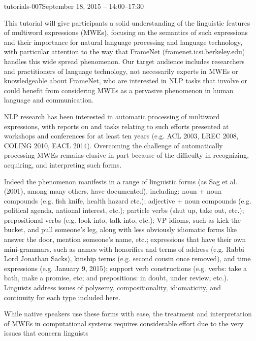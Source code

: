 \begin{tutorial}{tutorials-007}{September 18, 2015 -- 14:00--17:30}
{\TutLocG}

This tutorial will give participants a solid understanding of the
linguistic features of multiword expressions (MWEs), focusing on the
semantics of such expressions and their importance for natural language
processing and language technology, with particular attention to the
way that FrameNet (framenet.icsi.berkeley.edu) handles this wide spread
phenomenon. Our target audience includes researchers and practitioners
of language technology, not necessarily experts in MWEs or knowledgeable
about FrameNet, who are interested in NLP tasks that involve or could
benefit from considering MWEs as a pervasive phenomenon in human language
and communication.

NLP research has been interested in automatic processing of multiword
expressions, with reports on and tasks relating to such efforts presented
at workshops and conferences for at least ten years (e.g. ACL 2003,
LREC 2008, COLING 2010, EACL 2014). Overcoming the challenge of automatically
processing MWEs remains elusive in part because of the difficulty
in recognizing, acquiring, and interpreting such forms.

Indeed the phenomenon manifests in a range of linguistic forms (as
Sag et al. (2001), among many others, have documented), including:
noun + noun compounds (e.g. fish knife, health hazard etc.); adjective
+ noun compounds (e.g. political agenda, national interest, etc.);
particle verbs (shut up, take out, etc.); prepositional verbs (e.g.
look into, talk into, etc.); VP idioms, such as kick the bucket, and
pull someone’s leg, along with less obviously idiomatic forms like
answer the door, mention someone’s name, etc.; expressions that have
their own mini-grammars, such as names with honorifics and terms of
address (e.g. Rabbi Lord Jonathan Sacks), kinship terms (e.g. second
cousin once removed), and time expressions (e.g. January 9, 2015);
support verb constructions (e.g. verbs: take a bath, make a promise,
etc; and prepositions: in doubt, under review, etc.). Linguists address
issues of polysemy, compositionality, idiomaticity, and continuity
for each type included here.

While native speakers use these forms with ease, the treatment and
interpretation of MWEs in computational systems requires considerable
effort due to the very issues that concern linguists

\end{tutorial} \clearpage{}

